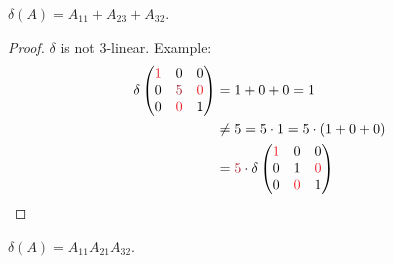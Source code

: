 \begin{exercise} \label{exercise 4.5.6}
\(\delta(A) = A_{11} + A_{23} + A_{32}\).
\end{exercise}

\begin{proof}
\(\delta\) is not \(3\)-linear. Example:
\begin{align*}
    \delta \begin{pmatrix}
        \RED{1} & 0 & 0 \\
        0 & \MAROON{5} & \RED{0} \\
        0 & \RED{0} & 1
    \end{pmatrix}
        & = 1 + 0 + 0 = 1 \\
        & \neq 5 = 5 \cdot 1 = 5 \cdot (1 + 0 + 0) \\
        & = \MAROON{5} \cdot \delta \begin{pmatrix}
            \RED{1} & 0 & 0 \\
            0 & 1 & \RED{0} \\
            0 & \RED{0} & 1
        \end{pmatrix}
\end{align*}
\end{proof}

\begin{exercise} \label{exercise 4.5.7}
\(\delta(A) = A_{11} A_{21} A_{32}\).
\end{exercise}

